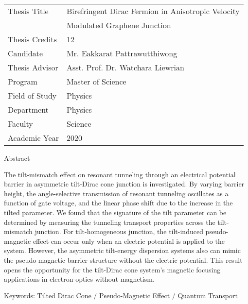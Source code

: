 \noindent 
{\begin{tabular}{ll} 
  Thesis Title &  Birefringent Dirac Fermion in Anisotropic Velocity  \\
               &  Modulated Graphene Junction \\
  Thesis Credits & 12 \\
  Candidate & Mr. Eakkarat Pattrawutthiwong \\
  Thesis Advisor & Asst. Prof. Dr. Watchara Liewrian \\
  Program & Master of Science  \\
  Field of Study & Physics \\
  Department & Physics \\
  Faculty & Science \\
  Academic Year & 2020 \\
\end{tabular}}

\vspace{1cm}

\centerline{Abstract}

\vspace{1cm}

The tilt-mismatch effect on resonant tunneling through an electrical potential barrier in asymmetric tilt-Dirac cone junction is investigated.
By varying barrier height, the angle-selective transmission of resonant tunneling oscillates as a function of gate voltage, and the linear phase shift due to the increase in the tilted parameter.
We found that the signature of the tilt parameter can be determined by measuring the tunneling transport properties across the tilt-mismatch junction.
For tilt-homogeneous junction, the tilt-induced pseudo-magnetic effect can occur only when an electric potential is applied to the system.
However, the asymmetric tilt-energy dispersion systems also can mimic the pseudo-magnetic barrier structure without the electric potential.
This result opens the opportunity for the tilt-Dirac cone system's magnetic focusing applications in electron-optics without magnetism.

\vspace{1cm}


{Keywords\;:}  Tilted Dirac Cone / Pseudo-Magnetic Effect / Quantum Transport


  
